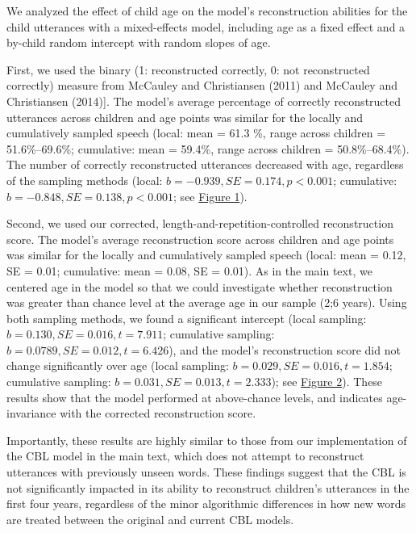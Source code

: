 \documentclass[man,mask,floatsintext]{apa6}
\begin{document}
We analyzed the effect of child age on the model's reconstruction
abilities for the child utterances with a mixed-effects model, including
age as a fixed effect and a by-child random intercept with random slopes
of age.

First, we used the binary (1: reconstructed correctly, 0: not
reconstructed correctly) measure from McCauley and Christiansen (2011)
and McCauley and Christiansen (2014){]}. The model's average percentage
of correctly reconstructed utterances across children and age points was
similar for the locally and cumulatively sampled speech (local: mean =
61.3 \%, range across children = 51.6\%--69.6\%; cumulative: mean =
59.4\%, range across children = 50.8\%--68.4\%). The number of correctly
reconstructed utterances decreased with age, regardless of the sampling
methods (local: \(b = -0.939, SE = 0.174, p < 0.001\); cumulative:
\(b = -0.848, SE = 0.138, p < 0.001\); see
\protect\hyperlink{smfig1}{Figure 1}).

Second, we used our corrected, length-and-repetition-controlled
reconstruction score. The model's average reconstruction score across
children and age points was similar for the locally and cumulatively
sampled speech (local: mean = 0.12, SE = 0.01; cumulative: mean = 0.08,
SE = 0.01). As in the main text, we centered age in the model so that we
could investigate whether reconstruction was greater than chance level
at the average age in our sample (2;6 years). Using both sampling
methods, we found a significant intercept (local sampling:
\(b = 0.130, SE = 0.016, t = 7.911\); cumulative sampling:
\(b = 0.0789, SE = 0.012, t = 6.426\)), and the model's reconstruction
score did not change significantly over age (local sampling:
\(b = 0.029, SE = 0.016, t = 1.854\); cumulative sampling:
\(b = 0.031, SE = 0.013, t = 2.333\)); see
\protect\hyperlink{smfig2}{Figure 2}). These results show that the model
performed at above-chance levels, and indicates age-invariance with the
corrected reconstruction score.

Importantly, these results are highly similar to those from our
implementation of the CBL model in the main text, which does not attempt
to reconstruct utterances with previously unseen words. These findings
suggest that the CBL is not significantly impacted in its ability to
reconstruct children's utterances in the first four years, regardless of
the minor algorithmic differences in how new words are treated between
the original and current CBL models.
\end{document}
